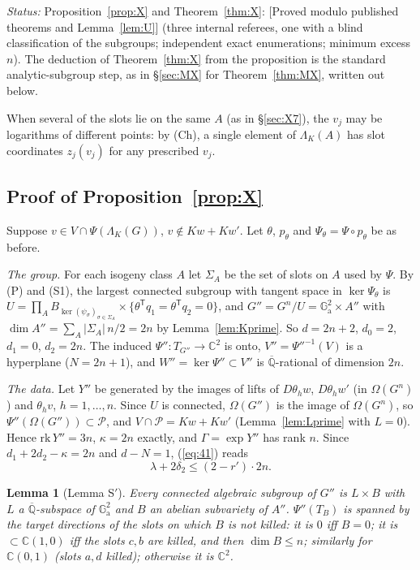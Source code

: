 \documentclass[11pt]{amsart}
\newtheorem{lemma}[theorem]{Lemma}
\theoremstyle{definition}
\newcommand{\Qb}{\overline{\mathbb{Q}}}
\newcommand{\C}{\mathbb{C}}
\newcommand{\Ga}{\mathbb{G}_{\mathrm a}}
\newcommand{\lab}[1]{\textup{[#1]}}
\newcommand{\LabC}{\lab{Proved modulo published theorems and Lemma~\ref{lem:U}}}
\newcommand{\Status}{\noindent\emph{Status:} }
\begin{document}
\Status Proposition~\ref{prop:X} and Theorem~\ref{thm:X}: \LabC{} (three internal referees, one with a blind classification of the subgroups; independent exact enumerations;
minimum excess $n$). The deduction of Theorem~\ref{thm:X} from the proposition is the standard analytic-subgroup step, as in
\S\ref{sec:MX} for Theorem~\ref{thm:MX}, written out below.

\noindent When several of the slots lie on the same $A$ (as in \S\ref{sec:X7}), the $v_j$ may be logarithms of different
points: by (Ch), a single element of $\Lambda_K(A)$ has slot coordinates $z_j(v_j)$ for any prescribed $v_j$.

\subsection{Proof of Proposition~\ref{prop:X}}
Suppose $v\in V\cap\Psi(\Lambda_K(G))$, $v\notin Kw+Kw'$. Let $\theta$, $p_\theta$ and $\Psi_\theta=\Psi\circ p_\theta$ be as before.

\emph{The group.} For each isogeny class $A$ let $\Sigma_A$ be the set of slots on $A$ used by $\Psi$. By (P) and (S1), the
largest connected subgroup with tangent space in $\ker\Psi_\theta$ is
$U=\prod_AB_{\ker(\psi_\sigma)_{\sigma\in\Sigma_A}}\times\{\theta^{\mathsf T}q_1=\theta^{\mathsf T}q_2=0\}$, and
$G''=G^n/U=\Ga^2\times A''$ with $\dim A''=\sum_A|\Sigma_A|\,n/2=2n$ by Lemma~\ref{lem:Kprime}. So $d=2n+2$, $d_0=2$,
$d_1=0$, $d_2=2n$. The induced $\Psi''\colon T_{G''}\to\C^2$ is onto, $V''=\Psi''^{-1}(V)$ is a hyperplane ($N=2n+1$), and
$W''=\ker\Psi''\subset V''$ is $\Qb$-rational of dimension $2n$.

\emph{The data.} Let $Y''$ be generated by the images of lifts of $D\theta_hw$, $D\theta_hw'$ (in $\Omega(G^n)$) and
$\theta_hv$, $h=1,\dots,n$. Since $U$ is connected, $\Omega(G'')$ is the image of $\Omega(G^n)$, so
$\Psi''(\Omega(G''))\subset\mathcal P$, and $V\cap\mathcal P=Kw+Kw'$ (Lemma~\ref{lem:Lprime} with $L=0$). Hence
$\mathrm{rk}\,Y''=3n$, $\kappa=2n$ exactly, and $\Gamma=\exp Y''$ has rank $n$. Since $d_1+2d_2-\kappa=2n$ and $d-N=1$,
(\ref{eq:41}) reads
\begin{equation}\label{eq:Xineq}
\lambda+2\delta_2\le(2-r')\cdot2n .
\end{equation}

\begin{lemma}[Lemma S$'$]\label{lem:Sprime}
Every connected algebraic subgroup of $G''$ is $L\times B$ with $L$ a $\Qb$-subspace of $\Ga^2$ and $B$ an abelian
subvariety of $A''$. $\Psi''(T_B)$ is spanned by the target directions of the slots on which $B$ is not killed: it is $0$
iff $B=0$; it is $\subset\C(1,0)$ iff the slots $c,b$ are killed, and then $\dim B\le n$; similarly for $\C(0,1)$ (slots
$a,d$ killed); otherwise it is $\C^2$.
\end{lemma}
\end{document}

